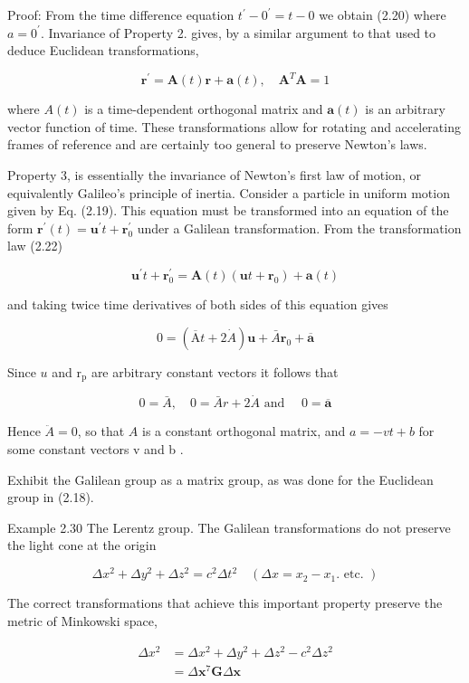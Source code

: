 Proof: From the time difference equation $t^{\prime}-0^{\prime}=t-0$ we obtain (2.20) where $a=0^{\prime}$. Invariance of Property 2. gives, by a similar argument to that used to deduce Euclidean transformations,

$$
\mathbf{r}^{\prime}=\mathbf{A}(t) \mathbf{r}+\mathbf{a}(t), \quad \mathbf{A}^T \mathbf{A}=1
$$

where $A(t)$ is a time-dependent orthogonal matrix and $\mathbf{a}(t)$ is an arbitrary vector function of time. These transformations allow for rotating and accelerating frames of reference and are certainly too general to preserve Newton's laws.

Property 3, is essentially the invariance of Newton's first law of motion, or equivalently Galileo's principle of inertia. Consider a particle in uniform motion given by Eq. (2.19). This equation must be transformed into an equation of the form $\mathbf{r}^{\prime}(t)=\mathbf{u}^{\prime} t+\mathbf{r}_0^{\prime}$ under a Galilean transformation. From the transformation law (2.22)

$$
\mathbf{u}^{\prime} t+\mathbf{r}_0^{\prime}=\mathbf{A}(t)\left(\mathbf{u} t+\mathbf{r}_0\right)+\mathbf{a}(t)
$$

and taking twice time derivatives of both sides of this equation gives

$$
0=(\overline{\mathrm{A}} t+2 \dot{A}) \mathbf{u}+\bar{A} \mathbf{r}_0+\overline{\mathbf{a}}
$$


Since $u$ and $\mathrm{r}_{\mathrm{p}}$ are arbitrary constant vectors it follows that

$$
0=\bar{A}, \quad 0=\bar{A} r+2 \dot{A} \text { and } \quad 0=\overline{\mathbf{a}}
$$


Hence $\ddot{A}=0$, so that $A$ is a constant orthogonal matrix, and $a=-v t+b$ for some constant vectors v and b .
\begin{exercise}
    Exhibit the Galilean group as a matrix group, as was done for the Euclidean group in (2.18).
\end{exercise}

Example 2.30 The Lerentz group. The Galilean transformations do not preserve the light cone at the origin

$$
\Delta x^2+\Delta y^2+\Delta z^2=c^2 \Delta t^2 \quad\left(\Delta x=x_2-x_1 . \text { etc. }\right)
$$


The correct transformations that achieve this important property preserve the metric of Minkowski space,

$$
\begin{aligned}
\Delta x^2 & =\Delta x^2+\Delta y^2+\Delta z^2-c^2 \Delta z^2 \\
& =\Delta \mathbf{x}^7 \mathbf{G} \Delta \mathbf{x}
\end{aligned}
$$

